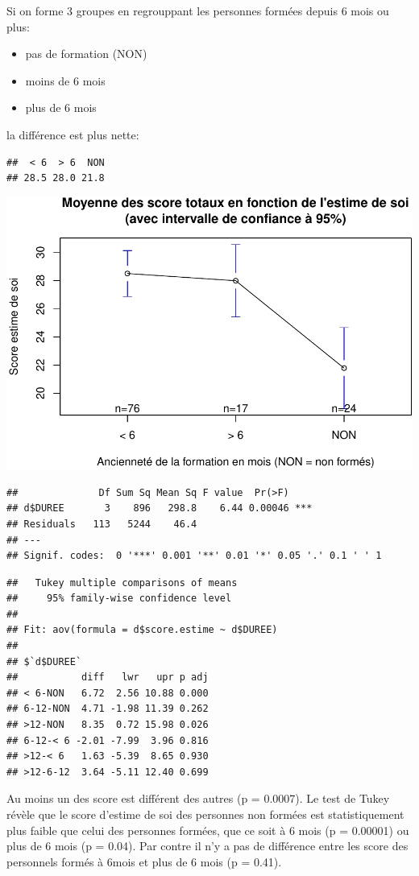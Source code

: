 \documentclass[]{article}
\begin{document}
Si on forme 3 groupes en regrouppant les personnes formées depuis 6 mois
ou plus:

\begin{itemize}
\itemsep1pt\parskip0pt
\item
  pas de formation (NON)
\item
  moins de 6 mois
\item
  plus de 6 mois
\end{itemize}

la différence est plus nette:

\begin{verbatim}
##  < 6  > 6  NON 
## 28.5 28.0 21.8
\end{verbatim}

\includegraphics{analyse_files/figure-latex/unnamed-chunk-29-1.pdf}

\begin{verbatim}
##              Df Sum Sq Mean Sq F value  Pr(>F)    
## d$DUREE       3    896   298.8    6.44 0.00046 ***
## Residuals   113   5244    46.4                    
## ---
## Signif. codes:  0 '***' 0.001 '**' 0.01 '*' 0.05 '.' 0.1 ' ' 1
\end{verbatim}

\begin{verbatim}
##   Tukey multiple comparisons of means
##     95% family-wise confidence level
## 
## Fit: aov(formula = d$score.estime ~ d$DUREE)
## 
## $`d$DUREE`
##           diff   lwr   upr p adj
## < 6-NON   6.72  2.56 10.88 0.000
## 6-12-NON  4.71 -1.98 11.39 0.262
## >12-NON   8.35  0.72 15.98 0.026
## 6-12-< 6 -2.01 -7.99  3.96 0.816
## >12-< 6   1.63 -5.39  8.65 0.930
## >12-6-12  3.64 -5.11 12.40 0.699
\end{verbatim}

Au moins un des score est différent des autres (p = 0.0007). Le test de
Tukey révèle que le score d'estime de soi des personnes non formées est
statistiquement plus faible que celui des personnes formées, que ce soit
à 6 mois (p = 0.00001) ou plus de 6 mois (p = 0.04). Par contre il n'y a
pas de différence entre les score des personnels formés à 6mois et plus
de 6 mois (p = 0.41).
\end{document}
